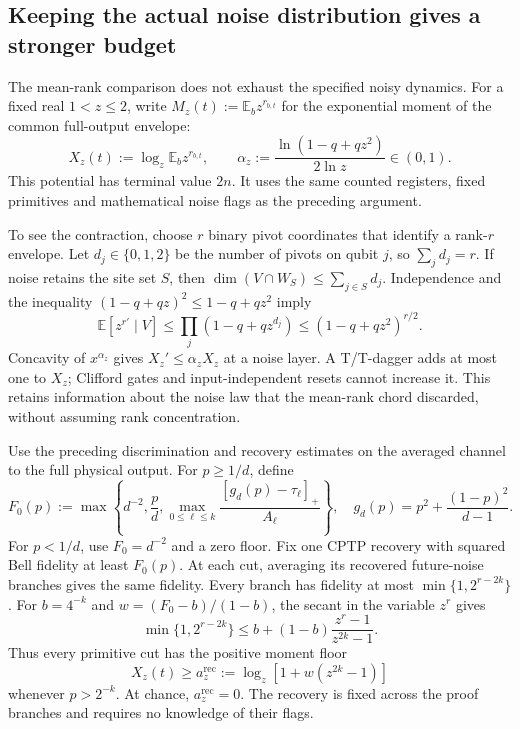 \documentclass[11pt,a4paper]{article}
\newcommand{\E}{\mathbb E}
\begin{document}
\subsection{Keeping the actual noise distribution gives a stronger budget}
The mean-rank comparison does not exhaust the specified noisy dynamics. For a fixed real $1<z\le2$, write $M_z(t):=\E_b z^{r_{b,t}}$ for the exponential moment of the common full-output envelope:
\begin{equation}
X_z(t):=\log_z\E_b z^{r_{b,t}},\qquad
\alpha_z:=\frac{\ln(1-q+qz^2)}{2\ln z}\in(0,1).
\label{eq:noisy-moment}
\end{equation}
This potential has terminal value $2n$. It uses the same counted registers, fixed primitives and mathematical noise flags as the preceding argument.

To see the contraction, choose $r$ binary pivot coordinates that identify a rank-$r$ envelope. Let $d_j\in\{0,1,2\}$ be the number of pivots on qubit $j$, so $\sum_jd_j=r$. If noise retains the site set $S$, then $\dim(V\cap W_S)\le\sum_{j\in S}d_j$. Independence and the inequality $(1-q+qz)^2\le1-q+qz^2$ imply
\[
\E[z^{r'}\mid V]\le\prod_j(1-q+qz^{d_j})
\le(1-q+qz^2)^{r/2}.
\]
Concavity of $x^{\alpha_z}$ gives $X_z'\le\alpha_zX_z$ at a noise layer. A T/T-dagger adds at most one to $X_z$; Clifford gates and input-independent resets cannot increase it. This retains information about the noise law that the mean-rank chord discarded, without assuming rank concentration.

Use the preceding discrimination and recovery estimates on the averaged channel to the full physical output. For $p\ge1/d$, define
\begin{equation}
F_0(p):=\max\left\{d^{-2},\frac pd,
\max_{0\le\ell\le k}
\frac{[g_d(p)-\tau_\ell]_+}{A_\ell}\right\},
\quad g_d(p)=p^2+\frac{(1-p)^2}{d-1}.
\label{eq:noisy-moment-recovery}
\end{equation}
For $p<1/d$, use $F_0=d^{-2}$ and a zero floor. Fix one CPTP recovery with squared Bell fidelity at least $F_0(p)$. At each cut, averaging its recovered future-noise branches gives the same fidelity. Every branch has fidelity at most $\min\{1,2^{r-2k}\}$. For $b=4^{-k}$ and $w=(F_0-b)/(1-b)$, the secant in the variable $z^r$ gives
\[
\min\{1,2^{r-2k}\}
\le b+(1-b)\frac{z^r-1}{z^{2k}-1}.
\]
Thus every primitive cut has the positive moment floor
\begin{equation}
X_z(t)\ge a_z^{\mathrm{rec}}:=\log_z\!\left[1+w(z^{2k}-1)\right]
\label{eq:noisy-moment-floor}
\end{equation}
whenever $p>2^{-k}$. At chance, $a_z^{\mathrm{rec}}=0$. The recovery is fixed across the proof branches and requires no knowledge of their flags.
\end{document}
